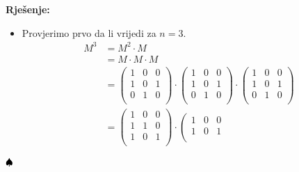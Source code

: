 \documentclass{article}
\newenvironment{solution}{\noindent\textbf{Rje\v senje:\newline}}{$\hfill\spadesuit$}
\begin{document}
\begin{solution}
    \begin{itemize}
        \item Provjerimo prvo da li vrijedi za $n=3$.
        \begin{equation*}
            \begin{aligned}
                M^3 &= M^2\cdot M \\
                    &= M\cdot M\cdot M \\
                    &= \left(
                        \begin{array}{ccc}
                            1 & 0 & 0 \\
                            1 & 0 & 1 \\
                            0 & 1 & 0 \\
                        \end{array}
                        \right)\cdot\left(
                        \begin{array}{ccc}
                            1 & 0 & 0 \\
                            1 & 0 & 1 \\
                            0 & 1 & 0 \\
                        \end{array}
                        \right)\cdot\left(
                        \begin{array}{ccc}
                            1 & 0 & 0 \\
                            1 & 0 & 1 \\
                            0 & 1 & 0 \\
                        \end{array}
                        \right)\\
                    &= \left(
                        \begin{array}{ccc}
                            1 & 0 & 0 \\
                            1 & 1 & 0 \\
                            1 & 0 & 1 \\
                        \end{array}
                        \right)\cdot\left(
                        \begin{array}{ccc}
                            1 & 0 & 0 \\
                            1 & 0 & 1 \\

\end{array}
\end{aligned}
\end{equation*}
\end{itemize}
\end{solution}
\end{document}
